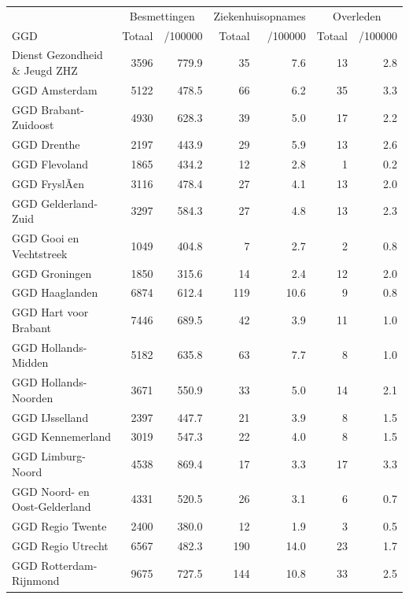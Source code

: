 \documentclass[
  english,
  man,floatsintext]{apa6}
\begin{document}
\begin{table}
\centering\begingroup\fontsize{10}{12}\selectfont

\begin{threeparttable}
\begin{tabular}{lrrrrrr}
\toprule
\multicolumn{1}{c}{ } & \multicolumn{2}{c}{Besmettingen} & \multicolumn{2}{c}{Ziekenhuisopnames} & \multicolumn{2}{c}{Overleden} \\
\cmidrule(l{3pt}r{3pt}){2-3} \cmidrule(l{3pt}r{3pt}){4-5} \cmidrule(l{3pt}r{3pt}){6-7}
GGD & Totaal & /100000 & Totaal & /100000 & Totaal & /100000\\
\midrule
Dienst Gezondheid \& Jeugd ZHZ & 3596 & 779.9 & 35 & 7.6 & 13 & 2.8\\
GGD Amsterdam & 5122 & 478.5 & 66 & 6.2 & 35 & 3.3\\
GGD Brabant-Zuidoost & 4930 & 628.3 & 39 & 5.0 & 17 & 2.2\\
GGD Drenthe & 2197 & 443.9 & 29 & 5.9 & 13 & 2.6\\
GGD Flevoland & 1865 & 434.2 & 12 & 2.8 & 1 & 0.2\\
GGD FryslÃ¢n & 3116 & 478.4 & 27 & 4.1 & 13 & 2.0\\
GGD Gelderland-Zuid & 3297 & 584.3 & 27 & 4.8 & 13 & 2.3\\
GGD Gooi en Vechtstreek & 1049 & 404.8 & 7 & 2.7 & 2 & 0.8\\
GGD Groningen & 1850 & 315.6 & 14 & 2.4 & 12 & 2.0\\
GGD Haaglanden & 6874 & 612.4 & 119 & 10.6 & 9 & 0.8\\
GGD Hart voor Brabant & 7446 & 689.5 & 42 & 3.9 & 11 & 1.0\\
GGD Hollands-Midden & 5182 & 635.8 & 63 & 7.7 & 8 & 1.0\\
GGD Hollands-Noorden & 3671 & 550.9 & 33 & 5.0 & 14 & 2.1\\
GGD IJsselland & 2397 & 447.7 & 21 & 3.9 & 8 & 1.5\\
GGD Kennemerland & 3019 & 547.3 & 22 & 4.0 & 8 & 1.5\\
GGD Limburg-Noord & 4538 & 869.4 & 17 & 3.3 & 17 & 3.3\\
GGD Noord- en Oost-Gelderland & 4331 & 520.5 & 26 & 3.1 & 6 & 0.7\\
GGD Regio Twente & 2400 & 380.0 & 12 & 1.9 & 3 & 0.5\\
GGD Regio Utrecht & 6567 & 482.3 & 190 & 14.0 & 23 & 1.7\\
GGD Rotterdam-Rijnmond & 9675 & 727.5 & 144 & 10.8 & 33 & 2.5\\

\end{tabular}
\end{threeparttable}
\end{table}
\end{document}
